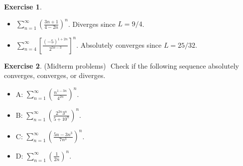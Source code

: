 \documentclass[12pt, psamsfonts]{amsart}
\theoremstyle{definition}
\newtheorem*{exer}{Exercise}
\theoremstyle{remark}
\numberwithin{equation}{section}
\begin{document}
\begin{exer}
$ $
  \begin{itemize}
    \item
      $\sum_{n=1}^{\infty} (\frac{3n + 1}{4 - 2n})^n$.
      Diverges since $L = 9/4$.
    \item
      $\sum_{n=4}^{\infty} [\frac{(-5)^{1 + 2n}}{2^{5n - 3}}]^n$.
      Absolutely converges since $L = 25/32$.
  \end{itemize}
\end{exer}

\begin{exer}{(Midterm problems)}
$ $
  Check if the following sequence absolutely converges, converges, or diverges.
  \begin{itemize}
    \item A: $\sum_{n=1}^{\infty} (\frac{n^{1-3n}}{4^{2n}})^n$.
    \item B: $\sum_{n=1}^{\infty} (\frac{2^{2n}3^n}{5 + 10^n})^n$.
    \item C: $\sum_{n=1}^{\infty} (\frac{5n - 3n^3}{7n^3})^n$.
    \item D: $\sum_{n=1}^{\infty} (\frac{1}{2n})^n$.
  \end{itemize}
\end{exer}
\end{document}
